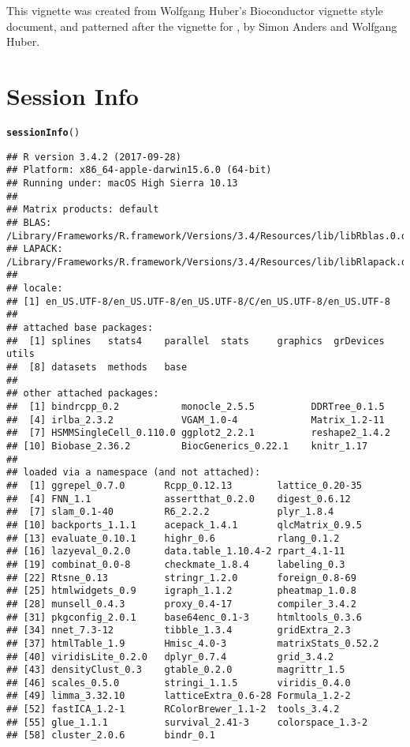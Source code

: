 \documentclass[10pt,oneside]{article}\usepackage[]{graphicx}\usepackage[]{color}
\makeatletter
\newcommand{\hlstd}[1]{\textcolor[rgb]{0.345,0.345,0.345}{#1}}%
\newcommand{\hlkwd}[1]{\textcolor[rgb]{0.737,0.353,0.396}{\textbf{#1}}}%
\newenvironment{kframe}{%
 \def\at@end@of@kframe{}%
 \ifinner\ifhmode%
  \def\at@end@of@kframe{\end{minipage}}%
  \begin{minipage}{\columnwidth}%
 \fi\fi%
 \def\FrameCommand##1{\hskip\@totalleftmargin \hskip-\fboxsep
 \colorbox{shadecolor}{##1}\hskip-\fboxsep
     \hskip-\linewidth \hskip-\@totalleftmargin \hskip\columnwidth}%
 \MakeFramed {\advance\hsize-\width
   \@totalleftmargin\z@ \linewidth\hsize
   \@setminipage}}%
 {\par\unskip\endMakeFramed%
 \at@end@of@kframe}
\newenvironment{knitrout}{}{} %
\makeatother
\begin{document}
 This vignette was created from Wolfgang Huber's Bioconductor vignette style document, and patterned after the vignette for , by Simon Anders and Wolfgang Huber.

\section{Session Info}
\begin{knitrout}
\color{fgcolor}\begin{kframe}
\begin{alltt}
\hlkwd{sessionInfo}\hlstd{()}
\end{alltt}
\begin{verbatim}
## R version 3.4.2 (2017-09-28)
## Platform: x86_64-apple-darwin15.6.0 (64-bit)
## Running under: macOS High Sierra 10.13
## 
## Matrix products: default
## BLAS: /Library/Frameworks/R.framework/Versions/3.4/Resources/lib/libRblas.0.dylib
## LAPACK: /Library/Frameworks/R.framework/Versions/3.4/Resources/lib/libRlapack.dylib
## 
## locale:
## [1] en_US.UTF-8/en_US.UTF-8/en_US.UTF-8/C/en_US.UTF-8/en_US.UTF-8
## 
## attached base packages:
##  [1] splines   stats4    parallel  stats     graphics  grDevices utils    
##  [8] datasets  methods   base     
## 
## other attached packages:
##  [1] bindrcpp_0.2           monocle_2.5.5          DDRTree_0.1.5         
##  [4] irlba_2.3.2            VGAM_1.0-4             Matrix_1.2-11         
##  [7] HSMMSingleCell_0.110.0 ggplot2_2.2.1          reshape2_1.4.2        
## [10] Biobase_2.36.2         BiocGenerics_0.22.1    knitr_1.17            
## 
## loaded via a namespace (and not attached):
##  [1] ggrepel_0.7.0       Rcpp_0.12.13        lattice_0.20-35    
##  [4] FNN_1.1             assertthat_0.2.0    digest_0.6.12      
##  [7] slam_0.1-40         R6_2.2.2            plyr_1.8.4         
## [10] backports_1.1.1     acepack_1.4.1       qlcMatrix_0.9.5    
## [13] evaluate_0.10.1     highr_0.6           rlang_0.1.2        
## [16] lazyeval_0.2.0      data.table_1.10.4-2 rpart_4.1-11       
## [19] combinat_0.0-8      checkmate_1.8.4     labeling_0.3       
## [22] Rtsne_0.13          stringr_1.2.0       foreign_0.8-69     
## [25] htmlwidgets_0.9     igraph_1.1.2        pheatmap_1.0.8     
## [28] munsell_0.4.3       proxy_0.4-17        compiler_3.4.2     
## [31] pkgconfig_2.0.1     base64enc_0.1-3     htmltools_0.3.6    
## [34] nnet_7.3-12         tibble_1.3.4        gridExtra_2.3      
## [37] htmlTable_1.9       Hmisc_4.0-3         matrixStats_0.52.2 
## [40] viridisLite_0.2.0   dplyr_0.7.4         grid_3.4.2         
## [43] densityClust_0.3    gtable_0.2.0        magrittr_1.5       
## [46] scales_0.5.0        stringi_1.1.5       viridis_0.4.0      
## [49] limma_3.32.10       latticeExtra_0.6-28 Formula_1.2-2      
## [52] fastICA_1.2-1       RColorBrewer_1.1-2  tools_3.4.2        
## [55] glue_1.1.1          survival_2.41-3     colorspace_1.3-2   
## [58] cluster_2.0.6       bindr_0.1
\end{verbatim}
\end{kframe}
\end{knitrout}



\end{document}
